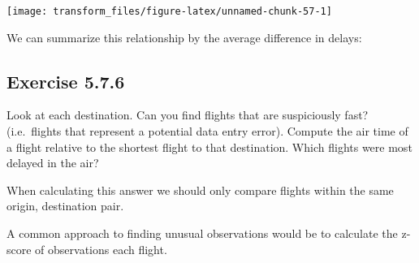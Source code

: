 \documentclass[]{book}
\newenvironment{Shaded}{\begin{snugshade}}{\end{snugshade}}
\newcommand{\CommentTok}[1]{\textcolor[rgb]{0.56,0.35,0.01}{\textit{#1}}}
\newcommand{\DataTypeTok}[1]{\textcolor[rgb]{0.13,0.29,0.53}{#1}}
\newcommand{\KeywordTok}[1]{\textcolor[rgb]{0.13,0.29,0.53}{\textbf{#1}}}
\newcommand{\NormalTok}[1]{#1}
\newcommand{\OperatorTok}[1]{\textcolor[rgb]{0.81,0.36,0.00}{\textbf{#1}}}
\newcommand{\OtherTok}[1]{\textcolor[rgb]{0.56,0.35,0.01}{#1}}
\newcommand{\StringTok}[1]{\textcolor[rgb]{0.31,0.60,0.02}{#1}}
\theoremstyle{plain}
\theoremstyle{remark}
\begin{document}
\begin{center}\texttt{[image: transform\_files/figure-latex/unnamed-chunk-57-1]} \end{center}

We can summarize this relationship by the average difference in delays:

\begin{Shaded}
\end{Shaded}

\hypertarget{exercise-5.7.6}{%
\subsection*{\texorpdfstring{Exercise
{5.7.6}}{Exercise 5.7.6}}\label{exercise-5.7.6}}

Look at each destination. Can you find flights that are suspiciously
fast? (i.e.~flights that represent a potential data entry error).
Compute the air time of a flight relative to the shortest flight to that
destination. Which flights were most delayed in the air?

When calculating this answer we should only compare flights within the
same origin, destination pair.

A common approach to finding unusual observations would be to calculate
the z-score of observations each flight.

\begin{Shaded}
\end{Shaded}
\end{document}
